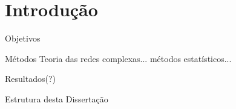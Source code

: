 %

\chapter{Introdução}


%

\begin{section}{Objetivos}
\end{section}

\begin{section}{Métodos}
	Teoria das redes complexas... métodos estatísticos...
\end{section}

\begin{section}{Resultados(?)}
\end{section}


\begin{section}{Estrutura desta Dissertação}	
\end{section}